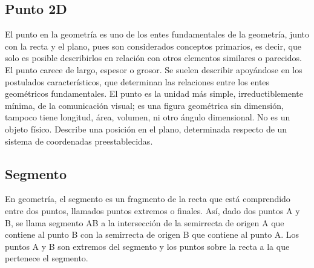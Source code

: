 \subsection{Punto 2D}
El punto en la geometría es uno de los entes fundamentales de la geometría, junto con la recta y el 
plano, pues son considerados conceptos primarios, es decir, que solo es posible describirlos en relación 
con otros elementos similares o parecidos. El punto carece de largo, espesor o grosor. Se suelen
describir apoyándose en los postulados característicos, que determinan las relaciones entre los entes 
geométricos fundamentales. El punto es la unidad más simple, irreductiblemente mínima, de la 
comunicación visual; es una figura geométrica sin dimensión, tampoco tiene longitud, área, volumen, ni 
otro ángulo dimensional. No es un objeto físico. Describe una posición en el plano, determinada respecto 
de un sistema de coordenadas preestablecidas. 

\subsection{Segmento}
En geometría, el segmento es un fragmento de la recta que está comprendido entre dos puntos, llamados puntos extremos o finales. Así, dado dos puntos A y B, se llama segmento AB a la intersección de la semirrecta de origen A que contiene al punto B con la semirrecta de origen B que contiene al punto A. Los puntos A y B son extremos del segmento y los puntos sobre la recta a la que pertenece el segmento. 